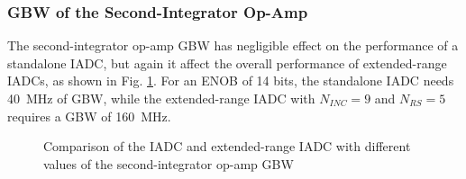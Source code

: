 \subsubsection{GBW of the Second-Integrator Op-Amp}
The second-integrator op-amp GBW has negligible effect on the performance of a standalone IADC, but again it affect the overall performance of extended-range IADCs, as shown in Fig. \ref{SNR_GBW2}. For an ENOB of 14 bits, the standalone IADC needs 40~MHz of GBW, while the extended-range IADC with $N_{INC}=9$ and $N_{RS}=5$ requires a GBW of 160~MHz.
\begin{figure}
\centering
{}
\hfil
{}
\caption{Comparison of the IADC and extended-range IADC with different values of the second-integrator op-amp GBW}
\label{SNR_GBW2}
\end{figure}
